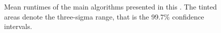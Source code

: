 \begin{figure}[p]
	\hfil{}\hfil
	\caption{
		Mean runtimes of the main algorithms presented in this .
		The tinted areas denote the three-sigma range, that is the 99.7\% confidence intervals.
	}
	\label{fig:tasklet:conclusion:runtime}
\end{figure}
